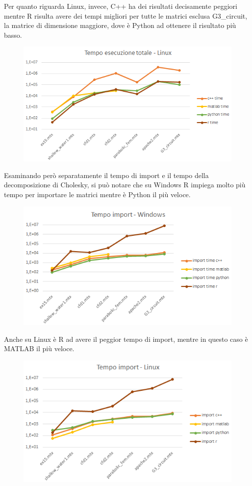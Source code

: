 \documentclass[a4paper,10pt]{article}
\begin{document}
Per quanto riguarda Linux, invece, C++ ha dei risultati decisamente peggiori mentre R risulta avere dei tempi migliori per tutte le matrici esclusa G3\_circuit, la matrice di dimensione maggiore, dove è Python ad ottenere il risultato più basso.

\begin{figure}[H]
\centering
  \includegraphics[width=0.6\linewidth]{img/tempototlinux.png}
\end{figure}

Esaminando però separatamente il tempo di import e il tempo della decomposizione di Cholesky, si può notare che su Windows R impiega molto più tempo per importare le matrici mentre è Python il più veloce.

\begin{figure}[H]
\centering
  \includegraphics[width=0.6\linewidth]{img/tempoimpwin.png}
\end{figure}

Anche su Linux è R ad avere il peggior tempo di import, mentre in questo caso è MATLAB il più veloce.
\begin{figure}[H]
\centering
  \includegraphics[width=0.57\linewidth]{img/tempoimplinux.png}
\end{figure}
\end{document}
